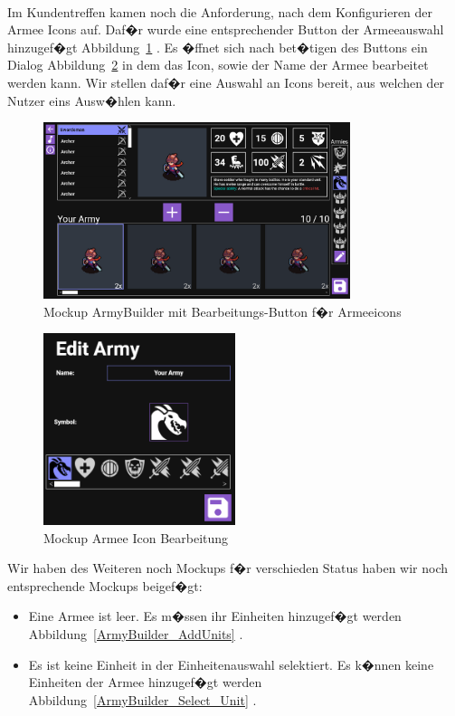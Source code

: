 \documentclass[12pt, titlepage]{scrartcl}
\newcommand{\Abb}[1]{%
	Abbildung\ \ref{#1}%
}
\begin{document}
		\ \\Im Kundentreffen kamen noch die Anforderung, nach dem Konfigurieren der Armee Icons auf. Daf�r wurde eine entsprechender Button der Armeeauswahl hinzugef�gt \Abb{ArmyBuilder_EditButton}. Es �ffnet sich nach bet�tigen des Buttons ein Dialog \Abb{AmryEditor} in dem das Icon, sowie der Name der Armee bearbeitet werden kann. Wir stellen daf�r eine Auswahl an Icons bereit, aus welchen der Nutzer eins Ausw�hlen kann. 
		\begin{figure}[H] 
			\centering
			\includegraphics[width=0.8\textwidth]{ArmyBuilder_Save_Edit.png}
			\caption{Mockup ArmyBuilder mit \glqq Bearbeitungs\grqq-Button f�r Armeeicons}
			\label{ArmyBuilder_EditButton}
		\end{figure}
		\begin{figure}[H] 
			\centering
			\includegraphics[width=0.5\textwidth]{ArmyEditor.png}
			\caption{Mockup Armee Icon Bearbeitung}
			\label{AmryEditor}
		\end{figure}
		Wir haben des Weiteren noch Mockups f�r verschieden Status haben wir noch entsprechende Mockups beigef�gt:
		\begin{itemize}
			\item Eine Armee ist leer. Es m�ssen ihr Einheiten hinzugef�gt werden \Abb{ArmyBuilder_AddUnits}.
			\item Es ist keine Einheit in der Einheitenauswahl selektiert. Es k�nnen keine Einheiten der Armee hinzugef�gt werden \Abb{ArmyBuilder_Select_Unit}. 
		\end{itemize}
\end{document}
